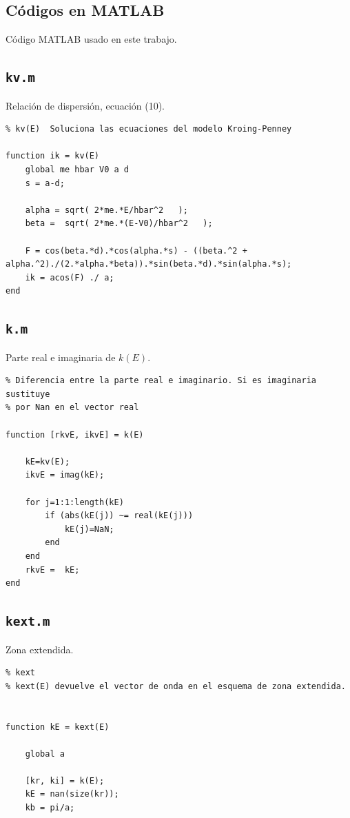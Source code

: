 \documentclass[reprint, amsmath, amssymb, aps, prb]{revtex4-2}
\begin{document}
\begin{appendices}
\section{Códigos en MATLAB}
\label{sec:code}



Código MATLAB usado en este trabajo.

\subsection{\texttt{kv.m}}
Relación de dispersión, ecuación (10).
\begin{lstlisting}
% kv(E)  Soluciona las ecuaciones del modelo Kroing-Penney

function ik = kv(E)
    global me hbar V0 a d
    s = a-d;

    alpha = sqrt( 2*me.*E/hbar^2   );
    beta =  sqrt( 2*me.*(E-V0)/hbar^2   );

    F = cos(beta.*d).*cos(alpha.*s) - ((beta.^2 + alpha.^2)./(2.*alpha.*beta)).*sin(beta.*d).*sin(alpha.*s);
    ik = acos(F) ./ a;
end
\end{lstlisting}

\subsection{\texttt{k.m}}
Parte real e imaginaria de $k(E)$.
\begin{lstlisting}
% Diferencia entre la parte real e imaginario. Si es imaginaria sustituye
% por Nan en el vector real

function [rkvE, ikvE] = k(E)
    
    kE=kv(E); 
    ikvE = imag(kE);

    for j=1:1:length(kE) 
        if (abs(kE(j)) ~= real(kE(j)))  
            kE(j)=NaN; 
        end
    end
    rkvE =  kE;
end
\end{lstlisting}

\subsection{\texttt{kext.m}}
Zona extendida.
\begin{lstlisting}
% kext
% kext(E) devuelve el vector de onda en el esquema de zona extendida.


function kE = kext(E)

    global a

    [kr, ki] = k(E);
    kE = nan(size(kr));
    kb = pi/a;


\end{lstlisting}
\end{appendices}
\end{document}
